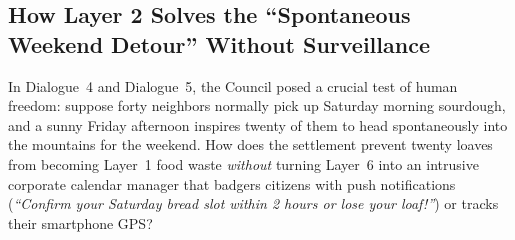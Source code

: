 \subsection{How Layer 2 Solves the ``Spontaneous Weekend Detour'' Without Surveillance}

In Dialogue~4 and Dialogue~5, the Council posed a crucial test of human freedom: suppose forty neighbors normally pick up Saturday morning sourdough, and a sunny Friday afternoon inspires twenty of them to head spontaneously into the mountains for the weekend. How does the settlement prevent twenty loaves from becoming Layer~1 food waste \textit{without} turning Layer~6 into an intrusive corporate calendar manager that badgers citizens with push notifications (\textit{``Confirm your Saturday bread slot within 2 hours or lose your loaf!''}) or tracks their smartphone GPS?


